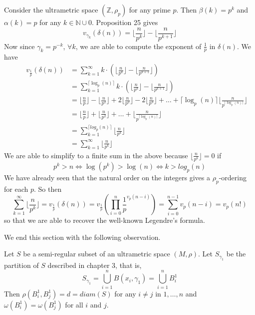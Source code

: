 \begin{example}
\label{legendre}
Consider the ultrametric space $(\mathbb{Z}, \rho_p)$  for any prime $p$. Then $\beta(k)=p^k$ and $\alpha(k)=p$ for any $k \in \mathbb{N} \cup 0$. Proposition 25 gives \\ \newpage
\[v_{\gamma_k}(\delta(n)) =\lfloor \frac{n}{p^{k}}\rfloor - \lfloor \frac{n}{p^{k+1}} \rfloor\]
Now since $\gamma_k = p^{-k}$, $\forall k$, we are able to compute the exponent of $\frac{1}{p}$ in $\delta(n)$. We have 
\begin{align*}
\qquad v_{\frac{1}{p}}(\delta(n)) &= \sum_{k=1}^{\infty} k \cdot (\lfloor \frac{n}{p^{k}}\rfloor - \lfloor \frac{n}{p^{k+1}} \rfloor) \\
 &= \sum_{k=1}^{\lceil \log_p(n) \rceil}  k \cdot (\lfloor \frac{n}{p^{k}}\rfloor - \lfloor \frac{n}{p^{k+1}} \rfloor)\\
 &= \lfloor \frac{n}{p}\rfloor - \lfloor \frac{n}{p^{2}} \rfloor +  2\lfloor \frac{n}{p^2}\rfloor - 2\lfloor \frac{n}{p^3} \rfloor + \ldots +  \lceil \log_p(n)\rceil \lfloor \frac{n}{p^{ \lceil \log_p(n)\rceil}} \rfloor \\
 &= \lfloor \frac{n}{p}\rfloor + \lfloor \frac{n}{p^2}\rfloor  + \ldots +  \lfloor \frac{n}{p^{ \lceil \log_p(n)\rceil}} \rfloor \\
 &=  \sum_{k=1}^{\lceil log_p(n) \rceil} \lfloor \frac{n}{p^{k}}\rfloor \\
 &=  \sum_{k=1}^{\infty} \lfloor \frac{n}{p^{k}}\rfloor 
\end{align*}
We are able to simplify to a finite sum in the above because $\lfloor \frac{n}{p^k} \rfloor = 0$ if \[ p^k > n \iff \log(p^k) > \log(n) \iff k > log_p(n)\]
We have already seen that the natural order on the integers gives a $\rho_p$-ordering for each $p$. So then \[\sum_{k=1}^{\infty} \lfloor \frac{n}{p^{k}}\rfloor= v_{\frac{1}{p}}(\delta(n)) = v_{\frac{1}{p}}(\prod_{i=0}^n \frac{1}{p}^{v_p(n-i)}) = \sum_{i=0}^{n-1} v_p(n-i)= v_{p}(n!)  \]
so that we are able to recover the well-known Legendre's formula.
\end{example}

We end this section with the following observation.

\begin{proposition}
	Let $S$ be a semi-regular subset of an ultrametric space $(M,\rho)$. Let $S_{\gamma_1}$ be the partition of $S$ described in chapter $3$, that is,
	\[S_{\gamma_1} = \bigcup_{i=1}^{n} B(x_i,\gamma_1) = \bigcup_{i=1}^{n} B^1_i\]
	Then $\rho(B^1_i, B^1_j) = d = diam(S)$ for any $i \neq j$ in $1,\ldots,n$ and $\omega( B^1_i) = \omega( B^1_j)$ for all $i$ and $j$.
\end{proposition}

